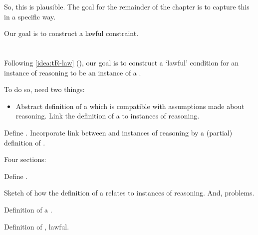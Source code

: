 \begin{note}
  So, this is plausible.
  The goal for the remainder of the chapter is to capture this in a specific way.

  Our goal is to construct a lawful constraint.
\end{note}

\section{}
\label{cha:typical:sec:tR}

\begin{note}
  Following \autoref{idea:tR-law} (), our goal is to construct a `lawful' condition for an instance of reasoning to be an instance of a \torN{}.

  To do so, need two things:

  \begin{itemize}
  \item
    Abstract definition of a \tor{} which is compatible with assumptions made about reasoning.
    Link the definition of a \tor{} to instances of reasoning.
  \end{itemize}

  Define \tor{}.
  Incorporate link between \torN{} and instances of reasoning by a (partial) definition of \tRN{}.
\end{note}

\begin{note}
  Four sections:

  \begin{TOCEnum}
  \item

    Define \tor{}.
  \item

    Sketch of how the definition of a \tor{} relates to instances of reasoning.
    And, problems.
  \item

    Definition of a \rotorN{}.
  \item

    Definition of \tR{}, lawful.
  \end{TOCEnum}
\end{note}


\subsection{}
\label{cha:typical:sec:tR:ToRdef}


